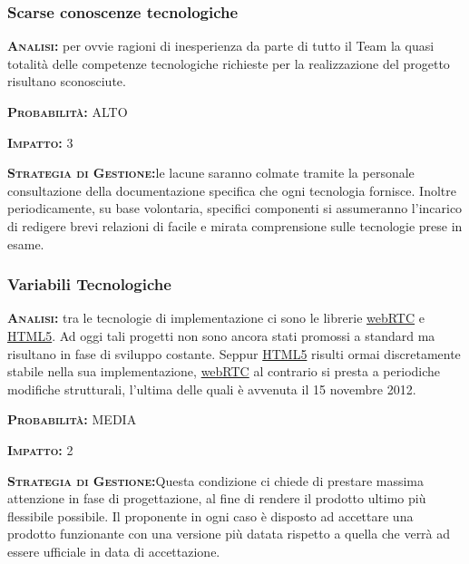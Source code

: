 \subsubsection{Scarse conoscenze tecnologiche}
\begin{description}
	\item{\scshape\bfseries Analisi:} per ovvie ragioni di inesperienza da parte di tutto il Team la quasi totalità delle competenze tecnologiche richieste per la realizzazione del progetto risultano sconosciute.
	\item{\scshape\bfseries Probabilità:} ALTO
	\item{\scshape\bfseries Impatto:} 3
	\item{\scshape\bfseries Strategia di Gestione:}le lacune saranno colmate tramite la personale consultazione della documentazione specifica che ogni tecnologia fornisce. Inoltre periodicamente, su base volontaria, specifici componenti si assumeranno l'incarico di redigere brevi relazioni di facile e mirata comprensione sulle tecnologie prese in esame.
\end{description}

\subsubsection{Variabili Tecnologiche}
\begin{description}
	\item{\scshape\bfseries Analisi:} tra le tecnologie di implementazione ci sono le librerie \underline{webRTC} e \underline{HTML5}. Ad oggi tali progetti non sono ancora stati promossi a standard ma risultano in fase di sviluppo costante. Seppur \underline{HTML5} risulti ormai discretamente stabile nella sua implementazione, \underline{webRTC} al contrario si presta a periodiche modifiche strutturali, l'ultima delle quali è avvenuta il 15 novembre 2012.
	\item{\scshape\bfseries Probabilità:} MEDIA
	\item{\scshape\bfseries Impatto:} 2
	\item{\scshape\bfseries Strategia di Gestione:}Questa condizione ci chiede di prestare massima attenzione in fase di progettazione, al fine di rendere il prodotto ultimo più flessibile possibile. Il proponente in ogni caso è disposto ad accettare una prodotto funzionante con una versione più datata rispetto a quella che verrà ad essere ufficiale in data di accettazione.
\end{description}

